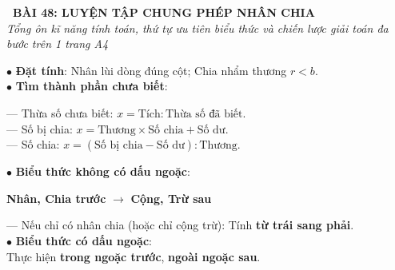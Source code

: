 \documentclass[14pt,a4paper,oneside]{extbook}
\begin{document}
\noindent
\begin{tcolorbox}[
  enhanced,
  colback=teal!8!white,
  colframe=teal!80!black,
  arc=3mm, boxrule=1pt,
  left=3mm, right=3mm, top=2mm, bottom=2mm,
  halign=center
]
  {\Large\bfseries\color{teal!90!black}\faBookmark\ BÀI 48: LUYỆN TẬP CHUNG PHÉP NHÂN CHIA}\\[1.5pt]
  {\footnotesize\itshape\color{black!75} Tổng ôn kĩ năng tính toán, thứ tự ưu tiên biểu thức và chiến lược giải toán đa bước trên 1 trang A4}
\end{tcolorbox}

\vspace{2mm}

\noindent
\begin{minipage}[t]{0.49\textwidth}
  \begin{tcolorbox}[
    enhanced,
    title={\footnotesize\bfseries\color{white}\faWrench\ 1. Kĩ thuật tính \& Tìm thành phần},
    colback=blue!2!white,
    colframe=blue!75!black,
    arc=2.5mm, boxrule=0.8pt, top=1.8mm, bottom=1.8mm, left=2mm, right=2mm
  ]
    \footnotesize
    $\bullet$ \textbf{Đặt tính}: Nhân lùi dòng đúng cột; Chia nhẩm thương $r < b$.\\
    $\bullet$ \textbf{Tìm thành phần chưa biết}:
    \par
    --- Thừa số chưa biết: $x = \text{Tích} : \text{Thừa số đã biết}$.\\
    --- Số bị chia: $x = \text{Thương} \times \text{Số chia} + \text{Số dư}$.\\
    --- Số chia: $x = (\text{Số bị chia} - \text{Số dư}) : \text{Thương}$.
  \end{tcolorbox}
\end{minipage}%
\hfill
\begin{minipage}[t]{0.49\textwidth}
  \begin{tcolorbox}[
    enhanced,
    title={\footnotesize\bfseries\color{white}\faClockO\ 2. Thứ tự thực hiện phép tính},
    colback=teal!2!white,
    colframe=teal!75!black,
    arc=2.5mm, boxrule=0.8pt, top=1.8mm, bottom=1.8mm, left=2mm, right=2mm
  ]
    \footnotesize
    $\bullet$ \textbf{Biểu thức không có dấu ngoặc}:
    \begin{center}
      \textbf{Nhân, Chia trước} $\rightarrow$ \textbf{Cộng, Trừ sau}
    \end{center}
    --- Nếu chỉ có nhân chia (hoặc chỉ cộng trừ): Tính \textbf{từ trái sang phải}.\\
    $\bullet$ \textbf{Biểu thức có dấu ngoặc}:\\
    Thực hiện \textbf{trong ngoặc trước}, \textbf{ngoài ngoặc sau}.
  \end{tcolorbox}
\end{minipage}
\end{document}
